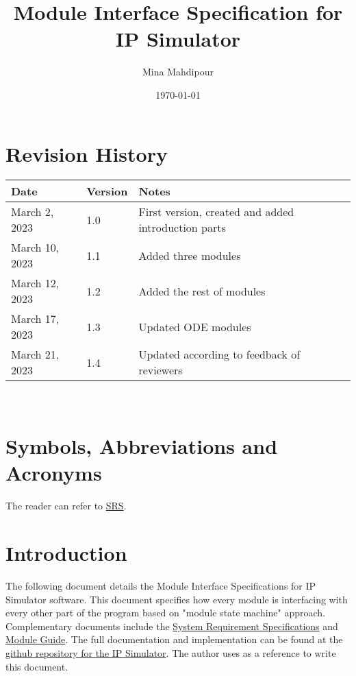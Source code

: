 \documentclass[12pt, titlepage]{article}
\begin{document}
\title{Module Interface Specification for IP Simulator}

\author{Mina Mahdipour}

\date{\today}

\maketitle


\section{Revision History}

\begin{tabularx}{\textwidth}{p{3cm}p{2cm}X}
\toprule {\bf Date} & {\bf Version} & {\bf Notes}\\
\midrule
March 2, 2023 & 1.0 & First version, created and added introduction parts\\
March 10, 2023 & 1.1 &  Added three modules\\
March 12, 2023 & 1.2 &  Added the rest of modules\\
March 17, 2023 & 1.3 &  Updated ODE modules\\
March 21, 2023 & 1.4 &  Updated according to feedback of reviewers\\
\bottomrule
\end{tabularx}

~\newpage

\section{Symbols, Abbreviations and Acronyms}

The reader can refer to \href{https://github.com/MinMah23/CAS741-Project/tree/main/docs/SRS}{SRS}. 

\newpage

\tableofcontents
\listoftables


\newpage


\section{Introduction}

The following document details the Module Interface Specifications for IP Simulator software. This document specifies how every module is interfacing with every other part of the program based on "module state machine" approach.
\\Complementary documents include the \href{https://github.com/MinMah23/CAS741-Project/tree/main/docs/SRS}{System Requirement Specifications}
and \href{https://github.com/MinMah23/CAS741-Project/tree/main/docs/Design/SoftArchitecture}{Module Guide}.  The full documentation and implementation can be
found at the \href{https://github.com/MinMah23/CAS741-Project}{github repository for the IP Simulator}. The author uses \cite{Smith2016} as a reference to write this document.
\end{document}
